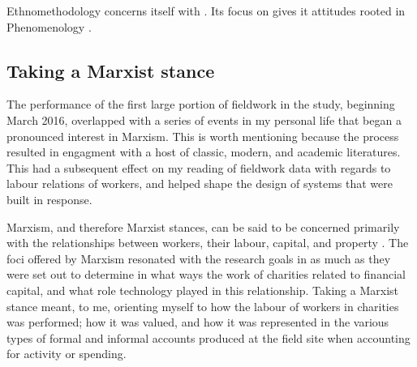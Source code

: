 Ethnomethodology concerns itself with . Its focus on  gives it attitudes rooted in Phenomenology \cite{sharrock_ethnomethodologists_1986}.




\subsection{Taking a Marxist stance}

The performance of the first large portion of fieldwork in the study, beginning March 2016, overlapped with a series of events in my personal life that began a pronounced interest in Marxism. This is worth mentioning because the process resulted in engagment with a host of classic, modern, and academic literatures. This had a subsequent effect on my reading of fieldwork data with regards to labour relations of workers, and helped shape the design of systems that were built in response.


Marxism, and therefore Marxist stances, can be said to be concerned primarily with the relationships between workers, their labour, capital, and property \cite{singer_marx:_2001, johnson_blackwell_2012}. The foci offered by Marxism resonated with the research goals in as much as they were set out to determine in what ways the work of charities related to financial capital, and what role technology played in this relationship. Taking a Marxist stance meant, to me, orienting myself to how the labour of workers in charities was performed; how it was valued, and how it was represented in the various types of formal and informal accounts produced at the field site when accounting for activity or spending.

